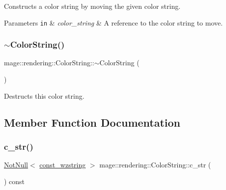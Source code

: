 Constructs a color string by moving the given color string.


\begin{DoxyParams}[1]{Parameters}
\mbox{\tt in}  & {\em color\+\_\+string} & A reference to the color string to move. \\
\hline
\end{DoxyParams}
\hypertarget{classmage_1_1rendering_1_1_color_string_a13ab2218e1cbe99241283214e455f3c9}{}\label{classmage_1_1rendering_1_1_color_string_a13ab2218e1cbe99241283214e455f3c9} 
\subsubsection{\texorpdfstring{$\sim$\+Color\+String()}{~ColorString()}}
{\footnotesize\ttfamily mage\+::rendering\+::\+Color\+String\+::$\sim$\+Color\+String (\begin{DoxyParamCaption}{ }\end{DoxyParamCaption})\hspace{0.3cm}{\ttfamily [default]}}

Destructs this color string. 

\subsection{Member Function Documentation}
\hypertarget{classmage_1_1rendering_1_1_color_string_a2706724097d2ad5c187d34db49d86bda}{}\label{classmage_1_1rendering_1_1_color_string_a2706724097d2ad5c187d34db49d86bda} 
\subsubsection{\texorpdfstring{c\+\_\+str()}{c\_str()}}
{\footnotesize\ttfamily \hyperlink{namespacemage_a8769f9d670d6b585ea306cb1062af94b}{Not\+Null}$<$ \hyperlink{namespacemage_ac409e0f2a22292a3a4cd42742994fbf0}{const\+\_\+wzstring} $>$ mage\+::rendering\+::\+Color\+String\+::c\+\_\+str (\begin{DoxyParamCaption}{ }\end{DoxyParamCaption}) const\hspace{0.3cm}{\ttfamily [noexcept]}}

